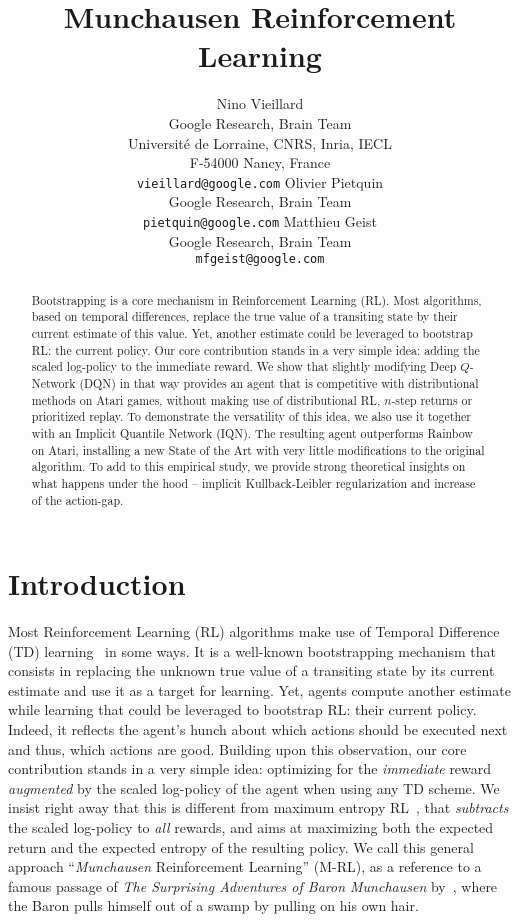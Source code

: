 \documentclass{article}
\title{Munchausen Reinforcement Learning}
\author{
 Nino Vieillard \\
 Google Research, Brain Team \\
 Universit\'e de Lorraine, CNRS, Inria, IECL\\
 F-54000 Nancy, France\\
 \texttt{vieillard@google.com}
 \And
 Olivier Pietquin \\
 Google Research, Brain Team \\
 \texttt{pietquin@google.com}
 \And 
 Matthieu Geist \\
 Google Research, Brain Team \\
 \texttt{mfgeist@google.com}}
\begin{document}
\maketitle


\begin{abstract}
    Bootstrapping is a core mechanism in Reinforcement Learning (RL). Most algorithms, based on temporal differences, replace the true value of a transiting state by their current estimate of this value. Yet, another estimate could be leveraged to bootstrap RL: the current policy. Our core contribution stands in a very simple idea: adding the scaled log-policy to the immediate reward. We show that slightly modifying Deep $Q$-Network (DQN) in that way provides an agent that is competitive with distributional methods on Atari games, without making use of distributional RL, $n$-step returns or prioritized replay. To demonstrate the versatility of this idea, we also use it together with an Implicit Quantile Network (IQN). The resulting agent outperforms Rainbow on Atari, installing a new State of the Art with very little modifications to the original algorithm. To add to this empirical study, we provide strong theoretical insights on what happens under the hood -- implicit Kullback-Leibler regularization and increase of the action-gap.
\end{abstract}


\section{Introduction}

 Most Reinforcement Learning (RL) algorithms make use of Temporal Difference (TD) learning~\citep{sutton1988learning} in some ways. It is a well-known bootstrapping mechanism that consists in replacing the unknown true value of a transiting state by its current estimate and use it as a target for learning. Yet, agents compute another estimate while learning that could be leveraged to bootstrap RL: their current policy. Indeed, it reflects the agent's hunch about which actions should be executed next and thus, which actions are good. Building upon this observation, our core contribution stands in a very simple idea: optimizing for the \emph{immediate} reward  \emph{augmented} by the scaled log-policy of the agent when using any TD scheme. We insist right away that this is different from maximum entropy RL~\citep{ziebart2010modeling}, that \emph{subtracts} the scaled log-policy to \emph{all} rewards, and aims at maximizing both the expected return and the expected entropy of the resulting policy. We call this general approach ``\emph{Munchausen} Reinforcement Learning'' (M-RL), as a reference to a famous passage of \textit{The Surprising Adventures of Baron Munchausen} by~\citet{raspe:1785}, where the Baron pulls himself out of a swamp by pulling on his own hair.
\end{document}
